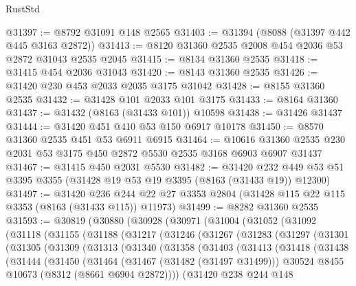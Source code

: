 \begin{lexlean}{RustStd}
\begin{coremodule}
@31397 := @8792 @31091 @148 @2565
@31403 := @31394 (@8088 (@31397 @442 @445 @3163 @2872))
@31413 := @8120 @31360 @2535 @2008 @454 @2036 @53 @2872 @31043 @2535 @2045
@31415 := @8134 @31360 @2535
@31418 := @31415 @454 @2036 @31043
@31420 := @8143 @31360 @2535
@31426 := @31420 @230 @453 @2033 @2035 @3175 @31042
@31428 := @8155 @31360 @2535
@31432 := @31428 @101 @2033 @101 @3175
@31433 := @8164 @31360
@31437 := @31432 (@8163 (@31433 @101)) @10598
@31438 := @31426 @31437
@31444 := @31420 @451 @410 @53 @150 @6917 @10178
@31450 := @8570 @31360 @2535 @451 @53 @6911 @6915
@31464 := @10616 @31360 @2535 @230 @2031 @53 @3175 @450 @2872 @5530 @2535 @3168 @6903 @6907 @31437
@31467 := @31415 @450 @2031 @5530
@31482 := @31420
    @232
    @449
    @53
    @51
    @3395
    @3355
    (@31428 @19 @53 @19 @3395 (@8163 (@31433 @19)) @12300)
@31497 := @31420
    @236
    @244
    @22
    @27
    @3353
    @2804
    (@31428 @115 @22 @115 @3353 (@8163 (@31433 @115)) @11973)
@31499 := @8282 @31360 @2535
@31593 := @30819
    (@30880
      (@30928
        (@30971
          (@31004
            (@31052
              (@31092
                (@31118
                  (@31155
                    (@31188
                      (@31217
                        (@31246
                          (@31267
                            (@31283
                              (@31297
                                (@31301
                                  (@31305
                                    (@31309
                                      (@31313
                                        (@31340
                                          (@31358
                                            (@31403
                                              (@31413
                                                (@31418
                                                  (@31438
                                                    (@31444
                                                      (@31450
                                                        (@31464
                                                          (@31467 (@31482 (@31497 @31499)))
                                                          @30524
                                                          @8455
                                                          @10673
                                                          (@8312 (@8661 @6904 @2872))))
                                                      (@31420
                                                        @238
                                                        @244
                                                        @148

\end{coremodule}
\end{lexlean}
